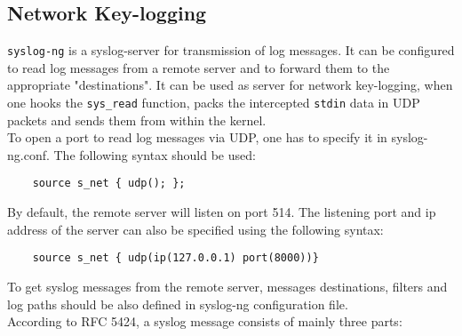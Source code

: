 \subsection{Network Key-logging}
\texttt{syslog-ng} is a syslog-server for transmission of log messages. It can be configured to read log messages from a remote server and to forward them to the appropriate "destinations". It can be used as server for network key-logging, when one hooks the \texttt{sys\_read} function, packs the intercepted \texttt{stdin} data in UDP packets and sends them from within the kernel.\\ 
To open a port to read log messages via UDP, one has to specify it in syslog-ng.conf. The following syntax should be used:
\begin{center}
\lstset{escapechar=,style=customc}
	\begin{lstlisting}
  	source s_net { udp(); };
	\end{lstlisting}
\end{center}
By default, the remote server will listen on port 514. The listening port and ip address of the server can also be specified using the following syntax:
\begin{center}
\lstset{escapechar=,style=customc}
	\begin{lstlisting}
  	source s_net { udp(ip(127.0.0.1) port(8000))}
	\end{lstlisting}
\end{center}
To get syslog messages from the remote server, messages destinations, filters and log paths should be also defined in syslog-ng configuration file.\\
According to RFC 5424, a syslog message consists of mainly three parts:
